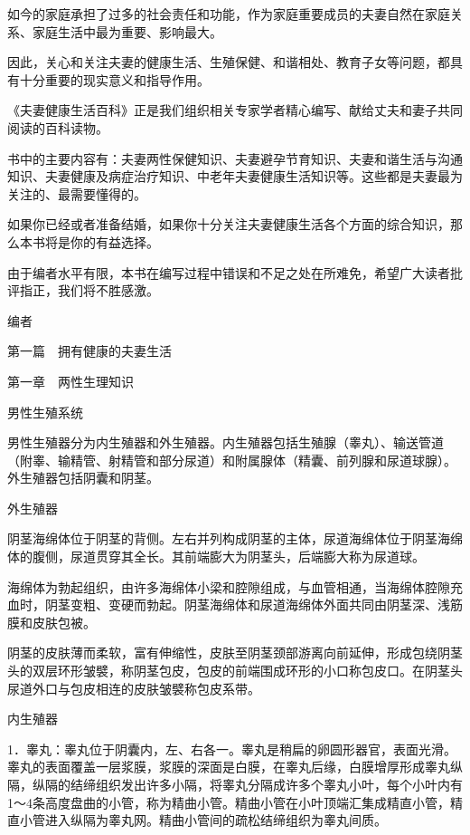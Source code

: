 \documentclass[12pt,UTF8]{ctexbook}
\begin{document}
如今的家庭承担了过多的社会责任和功能，作为家庭重要成员的夫妻自然在家庭关系、家庭生活中最为重要、影响最大。

因此，关心和关注夫妻的健康生活、生殖保健、和谐相处、教育子女等问题，都具有十分重要的现实意义和指导作用。

《夫妻健康生活百科》正是我们组织相关专家学者精心编写、献给丈夫和妻子共同阅读的百科读物。

书中的主要内容有：夫妻两性保健知识、夫妻避孕节育知识、夫妻和谐生活与沟通知识、夫妻健康及病症治疗知识、中老年夫妻健康生活知识等。这些都是夫妻最为关注的、最需要懂得的。

如果你已经或者准备结婚，如果你十分关注夫妻健康生活各个方面的综合知识，那么本书将是你的有益选择。

由于编者水平有限，本书在编写过程中错误和不足之处在所难免，希望广大读者批评指正，我们将不胜感激。

编者





第一篇　拥有健康的夫妻生活





第一章　两性生理知识


男性生殖系统


男性生殖器分为内生殖器和外生殖器。内生殖器包括生殖腺（睾丸）、输送管道（附睾、输精管、射精管和部分尿道）和附属腺体（精囊、前列腺和尿道球腺）。外生殖器包括阴囊和阴茎。

外生殖器

阴茎海绵体位于阴茎的背侧。左右并列构成阴茎的主体，尿道海绵体位于阴茎海绵体的腹侧，尿道贯穿其全长。其前端膨大为阴茎头，后端膨大称为尿道球。

海绵体为勃起组织，由许多海绵体小梁和腔隙组成，与血管相通，当海绵体腔隙充血时，阴茎变粗、变硬而勃起。阴茎海绵体和尿道海绵体外面共同由阴茎深、浅筋膜和皮肤包被。

阴茎的皮肤薄而柔软，富有伸缩性，皮肤至阴茎颈部游离向前延伸，形成包绕阴茎头的双层环形皱襞，称阴茎包皮，包皮的前端围成环形的小口称包皮口。在阴茎头尿道外口与包皮相连的皮肤皱襞称包皮系带。

内生殖器

1．睾丸：睾丸位于阴囊内，左、右各一。睾丸是稍扁的卵圆形器官，表面光滑。睾丸的表面覆盖一层浆膜，浆膜的深面是白膜，在睾丸后缘，白膜增厚形成睾丸纵隔，纵隔的结缔组织发出许多小隔，将睾丸分隔成许多个睾丸小叶，每个小叶内有1～4条高度盘曲的小管，称为精曲小管。精曲小管在小叶顶端汇集成精直小管，精直小管进入纵隔为睾丸网。精曲小管间的疏松结缔组织为睾丸间质。
\end{document}
